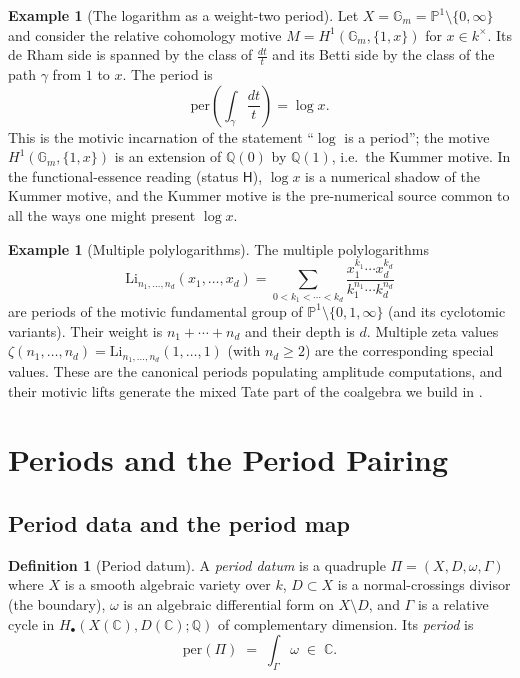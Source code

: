 \documentclass[12pt]{article}
\theoremstyle{definition}
\newtheorem{definition}[theorem]{Definition}
\newtheorem{example}[theorem]{Example}
\theoremstyle{remark}
\newcommand{\per}{\mathrm{per}}
\newcommand{\Li}{\mathrm{Li}}
\newcommand{\Qbb}{\mathbb{Q}}
\newcommand{\Cbb}{\mathbb{C}}
\newcommand{\Pbb}{\mathbb{P}}
\newcommand{\Gm}{\mathbb{G}_m}
\newcommand{\Hlab}{\ensuremath{\mathsf{H}}}
\begin{document}
\begin{example}[The logarithm as a weight-two period]
\label{ex:log}
Let $X=\Gm=\Pbb^1\setminus\{0,\infty\}$ and consider the relative cohomology motive
$M=H^1(\Gm,\{1,x\})$ for $x\in k^\times$. Its de Rham side is spanned by the class of
$\tfrac{dt}{t}$ and its Betti side by the class of the path $\gamma$ from $1$ to $x$. The
period is
\[
\per\left(\int_\gamma \frac{dt}{t}\right) = \log x .
\]
This is the motivic incarnation of the statement ``$\log$ is a period''; the motive
$H^1(\Gm,\{1,x\})$ is an extension of $\Qbb(0)$ by $\Qbb(1)$, i.e.\ the Kummer motive. In
the functional-essence reading (status \Hlab), $\log x$ is a numerical shadow of the Kummer
motive, and the Kummer motive is the pre-numerical source common to all the ways one might
present $\log x$.
\end{example}

\begin{example}[Multiple polylogarithms]
\label{ex:polylog}
The multiple polylogarithms
\[
\Li_{n_1,\dots,n_d}(x_1,\dots,x_d) = \sum_{0<k_1<\cdots<k_d}
\frac{x_1^{k_1}\cdots x_d^{k_d}}{k_1^{n_1}\cdots k_d^{n_d}}
\]
are periods of the motivic fundamental group of $\Pbb^1\setminus\{0,1,\infty\}$ (and its
cyclotomic variants). Their weight is $n_1+\cdots+n_d$ and their depth is $d$. Multiple zeta
values $\zeta(n_1,\dots,n_d)=\Li_{n_1,\dots,n_d}(1,\dots,1)$ (with $n_d\ge 2$) are the
corresponding special values. These are the canonical periods populating amplitude
computations, and their motivic lifts generate the mixed Tate part of the coalgebra we build
in .
\end{example}

\section{Periods and the Period Pairing}
\label{sec:periods}

\subsection{Period data and the period map}

\begin{definition}[Period datum]
\label{def:perioddatum}
A \emph{period datum} is a quadruple $\Pi = (X,D,\omega,\Gamma)$ where $X$ is a smooth
algebraic variety over $k$, $D\subset X$ is a normal-crossings divisor (the boundary),
$\omega$ is an algebraic differential form on $X\setminus D$, and $\Gamma$ is a relative cycle
in $H_\bullet(X(\Cbb),D(\Cbb);\Qbb)$ of complementary dimension. Its \emph{period} is
\begin{equation}
\per(\Pi) \;=\; \int_\Gamma \omega \;\in\;\Cbb.
\end{equation}
\end{definition}
\end{document}
